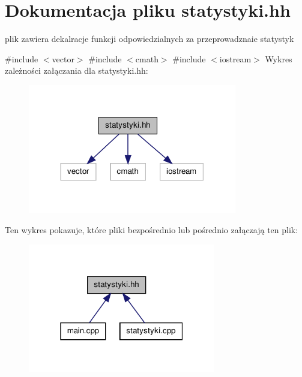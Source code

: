 \hypertarget{statystyki_8hh}{\section{\-Dokumentacja pliku statystyki.\-hh}
\label{statystyki_8hh}
}


plik zawiera dekalracje funkcji odpowiedzialnych za przeprowadznaie statystyk  


{\ttfamily \#include $<$vector$>$}\*
{\ttfamily \#include $<$cmath$>$}\*
{\ttfamily \#include $<$iostream$>$}\*
\-Wykres zależności załączania dla statystyki.\-hh\-:
\nopagebreak
\begin{figure}[H]
\begin{center}
\leavevmode
\includegraphics[width=258pt]{statystyki_8hh__incl}
\end{center}
\end{figure}
\-Ten wykres pokazuje, które pliki bezpośrednio lub pośrednio załączają ten plik\-:
\nopagebreak
\begin{figure}[H]
\begin{center}
\leavevmode
\includegraphics[width=232pt]{statystyki_8hh__dep__incl}
\end{center}
\end{figure}
